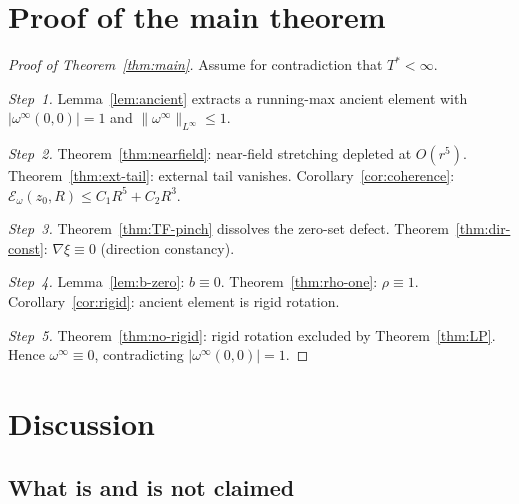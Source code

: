 \documentclass[12pt, reqno]{amsart}
\theoremstyle{definition}
\theoremstyle{remark}
\numberwithin{equation}{section}
\newcommand{\Ecal}{\mathcal{E}}
\newcommand{\step}[1]{\par\medskip\noindent\textit{Step~#1.}\enspace}
\begin{document}
\section{Proof of the main theorem}\label{sec:proof}

\begin{proof}[Proof of Theorem~\textup{\ref{thm:main}}]
Assume for contradiction that $T^*<\infty$.

\step{1}
Lemma~\ref{lem:ancient} extracts a running-max ancient element with
$|\omega^\infty(0,0)|=1$ and $\|\omega^\infty\|_{L^\infty}\le 1$.

\step{2}
Theorem~\ref{thm:nearfield}: near-field stretching depleted at $O(r^5)$.
Theorem~\ref{thm:ext-tail}: external tail vanishes.
Corollary~\ref{cor:coherence}: $\Ecal_\omega(z_0,R)\le C_1 R^5+C_2 R^3$.

\step{3}
Theorem~\ref{thm:TF-pinch} dissolves the zero-set defect.
Theorem~\ref{thm:dir-const}: $\nabla\xi\equiv 0$ (direction constancy).

\step{4}
Lemma~\ref{lem:b-zero}: $b\equiv 0$.
Theorem~\ref{thm:rho-one}: $\rho\equiv 1$.
Corollary~\ref{cor:rigid}: ancient element is rigid rotation.

\step{5}
Theorem~\ref{thm:no-rigid}: rigid rotation excluded by
Theorem~\ref{thm:LP}.
Hence $\omega^\infty\equiv 0$, contradicting $|\omega^\infty(0,0)|=1$.
\end{proof}

\section{Discussion}\label{sec:discussion}

\subsection{What is and is not claimed}
\end{document}
